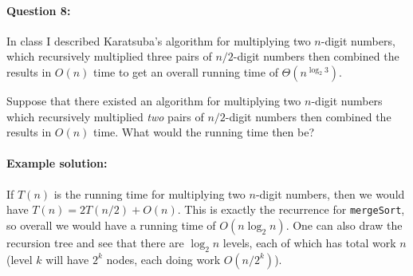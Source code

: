 \documentclass[11pt]{article}
\begin{document}
\paragraph{Question 8:}
In class I described Karatsuba's algorithm for multiplying two
$n$-digit numbers, which recursively multiplied three pairs of
$n/2$-digit
numbers then combined the results in $O(n)$ time to get an overall
running time of $\Theta(n^{\log_2 3})$.

Suppose that there existed an algorithm for multiplying two $n$-digit
numbers which recursively multiplied {\em two} pairs of $n/2$-digit
numbers
then combined the results in $O(n)$ time. What would the running time
then be?

\paragraph{Example solution:}
If $T(n)$ is the running time for multiplying two $n$-digit numbers,
then we would have $T(n) = 2T(n/2) + O(n)$.  This is exactly the
recurrence for \texttt{mergeSort}, so overall we would have a running
time of $O(n\log_2 n)$.  One can also draw the recursion tree and see
that there are $\log_2 n$ levels, each of which has total work $n$
(level $k$ will have $2^k$ nodes, each doing work $O(n/2^k)$).
\end{document}
